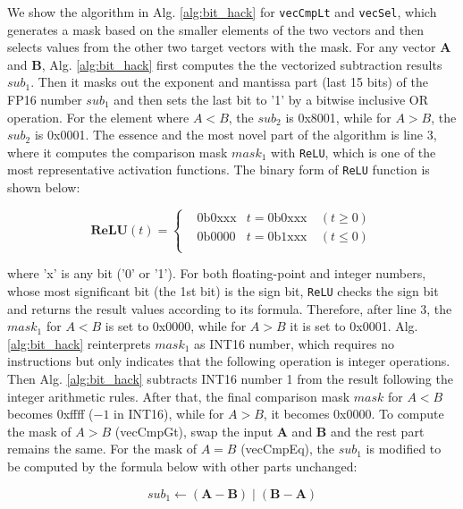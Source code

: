 \documentclass[12pt]{extbook}
\begin{document}
We show the algorithm in Alg. \ref{alg:bit_hack} for \verb|vecCmpLt| and \verb|vecSel|, which generates a mask based on the smaller elements of the two vectors and then selects values from the other two target vectors with the mask. For any vector \textbf{A} and \textbf{B}, Alg. \ref{alg:bit_hack} first computes the the vectorized subtraction results $sub_{1}$. Then it masks out the exponent and mantissa part (last 15 bits) of the FP16 number $sub_{1}$ and then sets the last bit to '1' by a bitwise inclusive OR operation. For the element where $A < B$, the $sub_{2}$ is 0x8001, while for $A > B$, the $sub_{2}$ is 0x0001. The essence and the most novel part of the algorithm is line 3, where it computes the comparison mask $mask_{1}$ with \verb|ReLU|, which is one of the most representative activation functions. The binary form of \verb|ReLU| function is shown below:

\begin{equation}
    \label{eq:relu}
    \textbf{ReLU}(t) = \left\{
    \begin{aligned}
        &\text{0b0xxx}  &t = \text{0b0xxx} \  &(t \ge 0) \\
        &\text{0b0000} &t = \text{0b1xxx} \  &(t \le 0) \\
    \end{aligned}
    \right.
\end{equation}
    
where 'x' is any bit ('0' or '1'). For both floating-point and integer numbers, whose most significant bit (the 1st bit) is the sign bit, \verb|ReLU| checks the sign bit and returns the result values according to its formula. Therefore, after line 3, the $mask_{1}$ for $A < B$ is set to 0x0000, while for $A > B$ it is set to 0x0001. Alg. \ref{alg:bit_hack} reinterprets $mask_{1}$ as INT16 number, which requires no instructions but only indicates that the following operation is integer operations. Then Alg. \ref{alg:bit_hack} subtracts INT16 number 1 from the result following the integer arithmetic rules. After that, the final comparison mask $mask$ for $A < B$ becomes 0xffff ($-1$ in INT16), while for $A > B$, it becomes 0x0000. To compute the mask of $A > B$ (vecCmpGt), swap the input $\textbf{A}$ and $\textbf{B}$ and the rest part remains the same. For the mask of $A = B$ (vecCmpEq), the $sub_{1}$ is modified to be computed by the formula below with other parts unchanged:

\begin{equation}
    sub_{1} \leftarrow (\textbf{A} - \textbf{B}) \mid (\textbf{B} - \textbf{A})
\end{equation}
\end{document}
